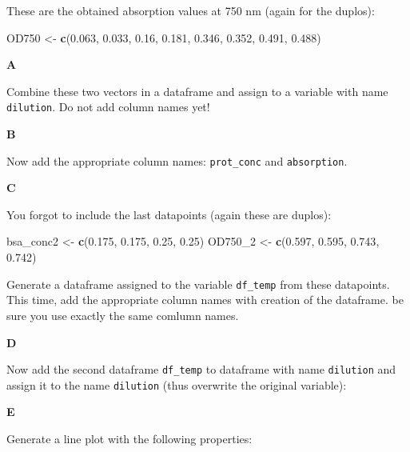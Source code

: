 \documentclass[]{book}
\newenvironment{Shaded}{\begin{snugshade}}{\end{snugshade}}
\newcommand{\DecValTok}[1]{\textcolor[rgb]{0.00,0.00,0.81}{#1}}
\newcommand{\FloatTok}[1]{\textcolor[rgb]{0.00,0.00,0.81}{#1}}
\newcommand{\KeywordTok}[1]{\textcolor[rgb]{0.13,0.29,0.53}{\textbf{#1}}}
\newcommand{\NormalTok}[1]{#1}
\newcommand{\StringTok}[1]{\textcolor[rgb]{0.31,0.60,0.02}{#1}}
\begin{document}
These are the obtained absorption values at 750 nm (again for the duplos):

\begin{Shaded}
\begin{Highlighting}[]
\NormalTok{OD750 <-}\StringTok{ }\KeywordTok{c}\NormalTok{(}\FloatTok{0.063}\NormalTok{,   }\FloatTok{0.033}\NormalTok{,  }\FloatTok{0.16}\NormalTok{,   }\FloatTok{0.181}\NormalTok{,  }\FloatTok{0.346}\NormalTok{,  }\FloatTok{0.352}\NormalTok{,  }\FloatTok{0.491}\NormalTok{,  }\FloatTok{0.488}\NormalTok{)}
\end{Highlighting}
\end{Shaded}

\textbf{A}

Combine these two vectors in a dataframe and assign to a variable with name \texttt{dilution}. Do not add column names yet!

\textbf{B}

Now add the appropriate column names: \texttt{prot\_conc} and \texttt{absorption}.

\textbf{C}

You forgot to include the last datapoints (again these are duplos):

\begin{Shaded}
\begin{Highlighting}[]
\NormalTok{bsa_conc2 <-}\StringTok{ }\KeywordTok{c}\NormalTok{(}\FloatTok{0.175}\NormalTok{,   }\FloatTok{0.175}\NormalTok{,  }\FloatTok{0.25}\NormalTok{,   }\FloatTok{0.25}\NormalTok{)}
\NormalTok{OD750_}\DecValTok{2}\NormalTok{ <-}\StringTok{ }\KeywordTok{c}\NormalTok{(}\FloatTok{0.597}\NormalTok{, }\FloatTok{0.595}\NormalTok{,  }\FloatTok{0.743}\NormalTok{,  }\FloatTok{0.742}\NormalTok{)}
\end{Highlighting}
\end{Shaded}

Generate a dataframe assigned to the variable \texttt{df\_temp} from these datapoints. This time, add the appropriate column names with creation of the dataframe. be sure you use exactly the same comlumn names.

\textbf{D}

Now add the second dataframe \texttt{df\_temp} to dataframe with name \texttt{dilution} and assign it to the name \texttt{dilution} (thus overwrite the original variable):

\textbf{E}

Generate a line plot with the following properties:
\end{document}

